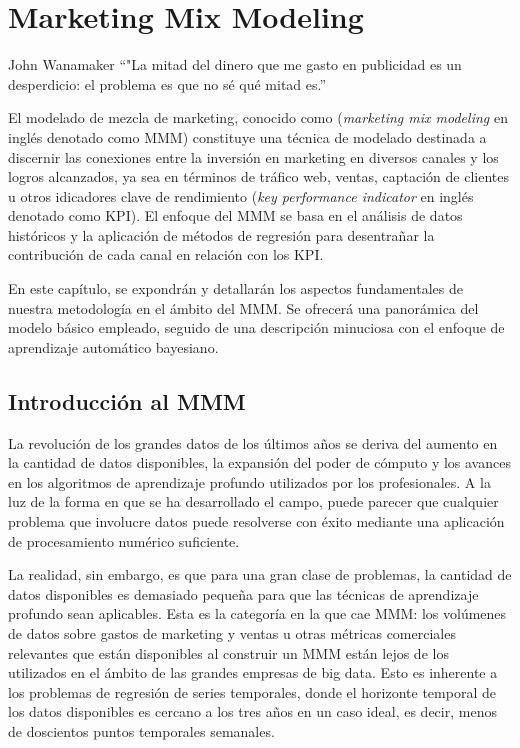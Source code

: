 
\chapter{Marketing Mix Modeling}

\begin{chapquote}{John Wanamaker}
	``"La mitad del dinero que me gasto en publicidad es un desperdicio: el problema es que no sé qué mitad es.''
\end{chapquote}



El modelado de mezcla de marketing, conocido como (\emph{marketing mix modeling} en inglés denotado como MMM) constituye una técnica de modelado destinada a discernir las conexiones entre la inversión en marketing en diversos canales y los logros alcanzados, ya sea en términos de tráfico web, ventas, captación de clientes u otros idicadores clave de rendimiento (\emph{key performance indicator} en inglés denotado como KPI). El enfoque del MMM se basa en el análisis de datos históricos y la aplicación de métodos de regresión para desentrañar la contribución de cada canal en relación con los KPI.

En este capítulo, se expondrán y detallarán los aspectos fundamentales de nuestra metodología en el ámbito del MMM. Se ofrecerá una panorámica del modelo básico empleado, seguido de una descripción minuciosa con el enfoque de aprendizaje automático bayesiano.

\section{Introducción al MMM}

La revolución de los grandes datos de los últimos años se deriva del aumento en la cantidad de datos disponibles, la expansión del poder de cómputo y los avances en los algoritmos de aprendizaje profundo utilizados por los profesionales. A la luz de la forma en que se ha desarrollado el campo, puede parecer que cualquier problema que involucre datos puede resolverse con éxito mediante una aplicación de procesamiento numérico suficiente.

La realidad, sin embargo, es que para una gran clase de problemas, la cantidad de datos disponibles es demasiado pequeña para que las técnicas de aprendizaje profundo sean aplicables. Esta es la categoría en la que cae MMM: los volúmenes de datos sobre gastos de marketing y ventas u otras métricas comerciales relevantes que están disponibles al construir un MMM están lejos de los utilizados en el ámbito de las grandes empresas de big data. Esto es inherente a los problemas de regresión de series temporales, donde el horizonte temporal de los datos disponibles es cercano a los tres años en un caso ideal, es decir, menos de doscientos puntos temporales semanales.

